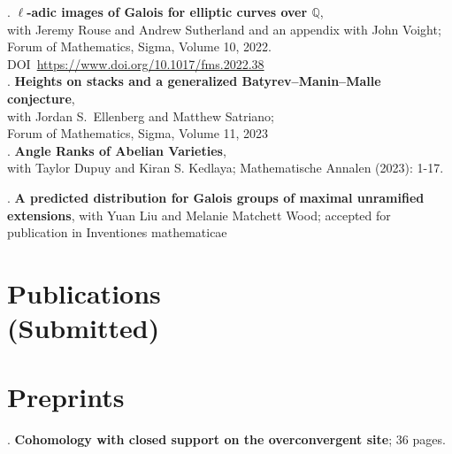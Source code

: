 \documentclass[margin,line]{res}
\newcounter{pubs}
\begin{document}
\begin{resume}
 .  \textbf{$\ell$-adic images of Galois for elliptic curves over $\mathbb{Q}$},\\
with Jeremy Rouse and Andrew Sutherland and an appendix with John Voight;\\
Forum of Mathematics, Sigma, Volume 10, 2022. DOI~\url{https://www.doi.org/10.1017/fms.2022.38}
\medskip\\
 .  \textbf{Heights on stacks and a generalized Batyrev--Manin--Malle conjecture},\\
with Jordan S.~Ellenberg and Matthew Satriano;\\
Forum of Mathematics, Sigma, Volume 11, 2023
\medskip\\
 .  \textbf{Angle Ranks of Abelian Varieties},\\ with Taylor Dupuy and Kiran S. Kedlaya; Mathematische Annalen (2023): 1-17.

 .  \textbf{A predicted distribution for Galois groups of maximal unramified extensions}, with Yuan Liu and Melanie Matchett Wood; accepted for publication in Inventiones mathematicae

\vspace{-7pt}
\section{\sc Publications \\ {(Submitted)}}



\section{\sc Preprints}
 .  \textbf{Cohomology with closed support on the overconvergent site}; 36 pages. \vspace{.48cm}\\


\end{resume}
\end{document}

